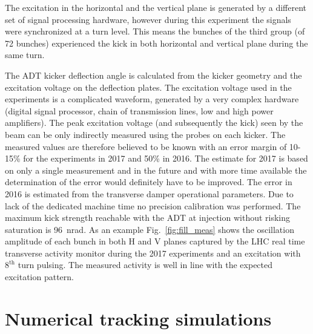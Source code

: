 \documentclass[%
 reprint,
 amsmath,amssymb,
 aps,
prstab,
longbibliography
]{revtex4-1}
\begin{document}
The excitation in the horizontal and the vertical plane is generated
by a different set of signal processing hardware, however during this
experiment the signals were synchronized at a turn level. This means
the bunches of the third group (of 72 bunches) experienced the kick in
both horizontal and vertical plane during the same turn.

The ADT kicker deflection angle is calculated from the kicker geometry
and the excitation voltage on the deflection plates. The excitation
voltage used in the experiments is a complicated waveform, generated
by a very complex hardware (digital signal processor, chain of
transmission lines, low and high power amplifiers). The peak
excitation voltage (and subsequently the kick) seen by the beam can be
only indirectly measured using the probes on each kicker. The measured
values are therefore believed to be known with an error margin of
10-15\% for the experiments in 2017 and 50\% in 2016. The estimate for
2017 is based on only a single measurement and in the future and with
more time available the determination of the error would definitely
have to be improved. The error in 2016 is estimated from the
transverse damper operational parameters. Due to lack of the dedicated
machine time no precision calibration was performed. The maximum kick
strength reachable with the ADT at injection without risking
saturation is 96~nrad. As an example Fig.~\ref{fig:fill_meas} shows
the oscillation amplitude of each bunch in both H and V planes
captured by the LHC real time transverse activity monitor during the
2017 experiments and an excitation with $8^{\mathrm{th}}$ turn
pulsing. The measured activity is well in line with the expected
excitation pattern.


\section{Numerical tracking simulations}
\label{sec:sim}
\end{document}
